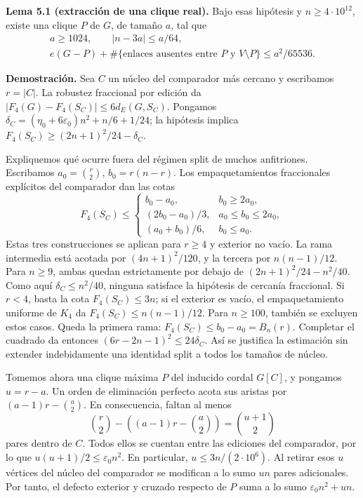 \documentclass[spanish,11pt,a4paper]{article}
\begin{document}

\textbf{Lema 5.1 (extracción de una clique real).} Bajo esas hipótesis y \(n\ge4\cdot10^{12}\), existe una clique \(P\) de \(G\), de tamaño \(a\), tal que \[
\begin{gathered}
a\ge1024,\qquad |n-3a|\le a/64,\\
e(G-P)+\#\{\text{enlaces ausentes entre }P\text{ y }V\setminus P\}
\le a^2/65536.
\end{gathered}
\tag{5.1}
\]

\textbf{Demostración.} Sea \(C\) un núcleo del comparador más cercano y escribamos \(r=|C|\). La robustez fraccional por edición da \(|F_4(G)-F_4(S_C)|\le6d_E(G,S_C)\). Pongamos \(\delta_C=(\eta_0+6\varepsilon_0)n^2+n/6+1/24\); la hipótesis implica \(F_4(S_C)\ge(2n+1)^2/24-\delta_C\).

Expliquemos qué ocurre fuera del régimen split de muchos anfitriones. Escribamos \(a_0=\binom r2\), \(b_0=r(n-r)\). Los empaquetamientos fraccionales explícitos del comparador dan las cotas \[
F_4(S_C)\le
\begin{cases}
b_0-a_0,&b_0\ge2a_0,\\
(2b_0-a_0)/3,&a_0\le b_0\le2a_0,\\
(a_0+b_0)/6,&b_0\le a_0.
\end{cases}
\tag{5.1a}
\] Estas tres construcciones se aplican para \(r\ge4\) y exterior no vacío. La rama intermedia está acotada por \((4n+1)^2/120\), y la tercera por \(n(n-1)/12\). Para \(n\ge9\), ambas quedan estrictamente por debajo de \((2n+1)^2/24-n^2/40\). Como aquí \(\delta_C\le n^2/40\), ninguna satisface la hipótesis de cercanía fraccional. Si \(r<4\), basta la cota \(F_4(S_C)\le3n\); si el exterior es vacío, el empaquetamiento uniforme de \(K_4\) da \(F_4(S_C)\le n(n-1)/12\). Para \(n\ge100\), también se excluyen estos casos. Queda la primera rama: \(F_4(S_C)\le b_0-a_0=B_n(r)\). Completar el cuadrado da entonces \((6r-2n-1)^2\le24\delta_C\). Así se justifica la estimación sin extender indebidamente una identidad split a todos los tamaños de núcleo.

Tomemos ahora una clique máxima \(P\) del inducido cordal \(G[C]\), y pongamos \(u=r-a\). Un orden de eliminación perfecto acota sus aristas por \((a-1)r-\binom a2\). En consecuencia, faltan al menos \[
\binom r2-\left((a-1)r-\binom a2\right)
=\binom{u+1}{2}
\] pares dentro de \(C\). Todos ellos se cuentan entre las ediciones del comparador, por lo que \(u(u+1)/2\le\varepsilon_0n^2\). En particular, \(u\le3n/(2\cdot10^6)\). Al retirar esos \(u\) vértices del núcleo del comparador se modifican a lo sumo \(un\) pares adicionales. Por tanto, el defecto exterior y cruzado respecto de \(P\) suma a lo sumo \(\varepsilon_0n^2+un\).
\end{document}

